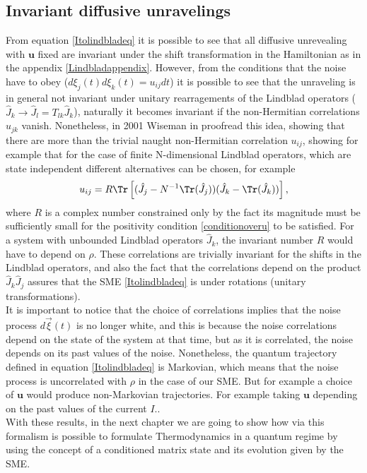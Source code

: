\subsection{Invariant diffusive unravelings}
From equation \eqref{Itolindbladeq} it is possible to see that all diffusive unrevealing with $\mathbf{u}$ fixed are invariant under the shift transformation in the Hamiltonian as in the appendix \ref{Lindbladappendix}. However, from the conditions that the noise have to obey ($d\xi_j(t)d\xi_k(t)=u_{ij}dt$) it is possible to see that the unraveling is in general not invariant under unitary rearragements of the Lindblad operators  ($\hat{J}_k\rightarrow\hat{J}_l=T_{lk}\hat{J}_k$), naturally it becomes invariant if the non-Hermitian correlations $u_{jk}$ vanish. Nonetheless, in 2001 Wiseman in \cite{WISEMAN200191} proofread this idea, showing that there are more than the trivial naught non-Hermitian correlation $u_{ij}$, showing for example that for the case of finite N-dimensional Lindblad operators, which are state independent different alternatives can be chosen, for example
\begin{equation}
u_{ij}=R\Tr\left[(\hat{J}_j-N^{-1}\Tr(\hat{J}_j))(\hat{J}_k-\Tr(\hat{J}_k))\right],
\label{non-hermitiancorrelation}
\end{equation}
where $R$ is a complex number constrained only by the fact its magnitude must be sufficiently small for the positivity condition \eqref{conditionoveru} to be satisfied. For a system with unbounded Lindblad operators $\hat{J}_k$, the invariant number $R$ would have to depend on $\rho$. These correlations are trivially invariant for the shifts in the Lindblad operators, and also the fact that the correlations depend on the product $\hat{J}_k\hat{J}_j$ assures that the SME \eqref{Itolindbladeq} is under rotations (unitary transformations).\\
It is important to notice that the choice of correlations implies that the noise process $d\vec{\xi}(t)$ is no longer white, and this is because the noise correlations depend on the state of the system at that time, but as it is correlated, the noise depends on its past values of the noise. Nonetheless, the quantum trajectory defined in equation \eqref{Itolindbladeq} is Markovian, which means that the noise process is uncorrelated with $\rho$ in the case of our SME. But for example a choice of $\mathbf{u}$ would produce non-Markovian trajectories. For example taking $\mathbf{u}$ depending on the past values of the current $I$.\cite{PhysRevLett.75.4587}.
\\

With these results, in the next chapter we are going to show how via this formalism is possible to formulate Thermodynamics in a quantum regime by using the concept of a conditioned matrix state and its evolution given by the SME.




